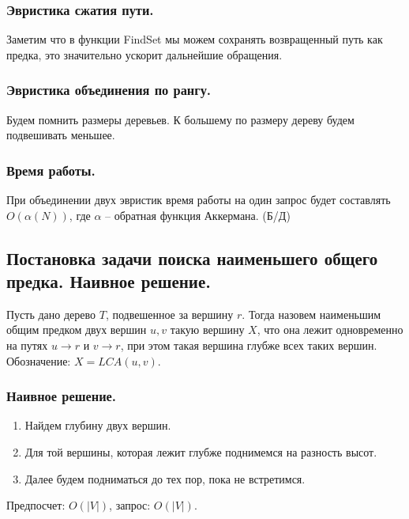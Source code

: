 \documentclass[a4paper,14pt]{article}
\begin{document}
    \subsubsection*{Эвристика сжатия пути.}
        Заметим что в функции FindSet мы можем сохранять
    возвращенный путь как предка, это значительно ускорит
    дальнейшие обращения.
    \subsubsection*{Эвристика объединения по рангу.}
    Будем помнить размеры деревьев. К большему по размеру дереву будем подвешивать меньшее.
    \subsubsection*{Время работы.}
    При объединении двух эвристик время работы на один запрос будет 
    составлять $O(\alpha (N))$, где $\alpha$ – обратная функция Аккермана. (Б/Д)

    \subsection{Постановка задачи поиска наименьшего общего предка. Наивное решение.}
    \label{subsec:lca}
  
    \begin{Def}
        Пусть дано дерево $T$, подвешенное за вершину $r$. Тогда назовем
    наименьшим общим предком двух вершин $u,v$ такую вершину $X$,
    что она лежит одновременно на путях $u \rightarrow r$ и $v \rightarrow r$, при этом
    такая вершина глубже всех таких вершин. \\
    Обозначение: $X = LCA(u,v)$.
    \end{Def}
    \subsubsection*{Наивное решение.}
    \begin{enumerate}
        \item Найдем глубину двух вершин.
        \item Для той вершины, которая лежит глубже поднимемся на
        разность высот.
        \item Далее будем подниматься до тех пор, пока не встретимся.
    \end{enumerate}
    Предпосчет: $O(|V|)$, запрос: $O(|V|)$.
\end{document}
